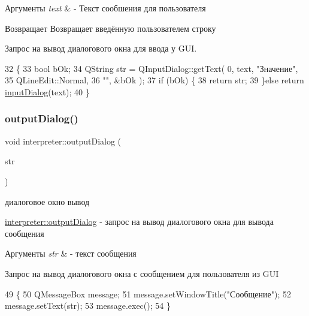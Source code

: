 \begin{DoxyParams}{Аргументы}
{\em text} & -\/ Текст сообшения для пользователя \\
\hline
\end{DoxyParams}
\begin{DoxyReturn}{Возвращает}
Возвращает введённую пользователем строку
\end{DoxyReturn}
Запрос на вывод диалогового окна для ввода у G\+UI. 
\begin{DoxyCode}
32 \{
33     \textcolor{keywordtype}{bool} bOk;
34     QString str = QInputDialog::getText( 0, text, \textcolor{stringliteral}{"Значение"},
35                                          QLineEdit::Normal,
36                                          \textcolor{stringliteral}{""}, &bOk );
37     \textcolor{keywordflow}{if} (bOk) \{
38         \textcolor{keywordflow}{return} str;
39     \}\textcolor{keywordflow}{else} \textcolor{keywordflow}{return} \hyperlink{classinterpreter_a30d9b904383c7b73adceeca002461431}{inputDialog}(text);
40 \}
\end{DoxyCode}
\hypertarget{classinterpreter_a5d3ba23a48b814586dabbe2e3507b93a}{}\label{classinterpreter_a5d3ba23a48b814586dabbe2e3507b93a} 
\subsubsection{\texorpdfstring{output\+Dialog()}{outputDialog()}}
{\footnotesize\ttfamily void interpreter\+::output\+Dialog (\begin{DoxyParamCaption}\item[{Q\+String}]{str }\end{DoxyParamCaption})\hspace{0.3cm}{\ttfamily [private]}}



диалоговое окно вывод 

\hyperlink{classinterpreter_a5d3ba23a48b814586dabbe2e3507b93a}{interpreter\+::output\+Dialog} -\/ запрос на вывод диалогового окна для вывода сообщения


\begin{DoxyParams}{Аргументы}
{\em str} & -\/ текст сообщения\\
\hline
\end{DoxyParams}
Запрос на вывод диалогового окна с сообщением для пользователя из G\+UI 
\begin{DoxyCode}
49 \{
50     QMessageBox message;
51     message.setWindowTitle(\textcolor{stringliteral}{"Сообщение"});
52     message.setText(str);
53     message.exec();
54 \}
\end{DoxyCode}
\hypertarget{classinterpreter_af9ed8afd864c69cfd1ec1e849b2d1542}{}\label{classinterpreter_af9ed8afd864c69cfd1ec1e849b2d1542} 
